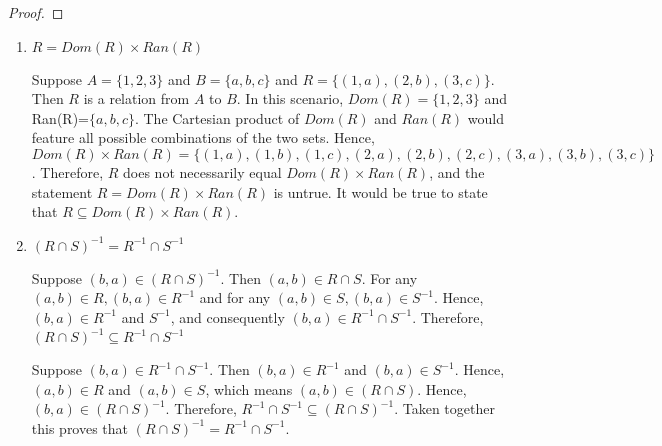 

\begin{theorem}
\end{theorem}

\begin{proof}
\end{proof}

\begin{enumerate}[label=\alph*]
  \item $R=Dom(R) \times Ran(R)$

    Suppose $A=\{1,2,3\}$ and $B=\{a,b,c\}$ and $R=\{(1,a),(2,b),(3,c)\}$.
    Then $R$ is a relation from $A$ to $B$. In this scenario,
    $Dom(R)=\{1,2,3\}$ and Ran(R)=$\{a,b,c\}$. The Cartesian
    product of $Dom(R)$ and $Ran(R)$ would feature all possible
    combinations of the two sets. Hence, $Dom(R) \times
    Ran(R)=\{(1,a),(1,b),(1,c),(2,a),(2,b),(2,c),(3,a),(3,b),(3,c)\}$.
    Therefore, $R$ does not necessarily equal $Dom(R) \times Ran(R)$, and the
    statement $R = Dom(R) \times Ran(R)$ is untrue. It would be true to state
    that $R \subseteq Dom(R) \times Ran(R)$.

  \item $(R \cap S)^{-1}=R^{-1} \cap S^{-1}$

    Suppose $(b,a) \in (R \cap S)^{-1}$. Then $(a,b) \in R \cap S$. For any
    $(a,b) \in R, (b,a) \in R^{-1}$ and for any $(a,b) \in S, (b,a) \in
    S^{-1}$. Hence, $(b,a) \in R^{-1}$ and $S^{-1}$, and consequently $(b,a) \in
    R^{-1} \cap S^{-1}$. Therefore, $(R \cap
    S)^{-1} \subseteq R^{-1} \cap S^{-1}$

    Suppose $(b,a) \in R^{-1} \cap S^{-1}$. Then $(b,a) \in R^{-1}$ and $(b,a)
    \in S^{-1}$. Hence, $(a,b) \in R$ and $(a,b) \in S$, which means $(a,b) \in
    (R \cap S)$. Hence, $(b,a) \in (R \cap S)^{-1}$. Therefore, $R^{-1} \cap
    S^{-1} \subseteq (R \cap S)^{-1}$. Taken together this proves that $(R \cap
    S)^{-1} = R^{-1} \cap S^{-1}$.
\end{enumerate}
